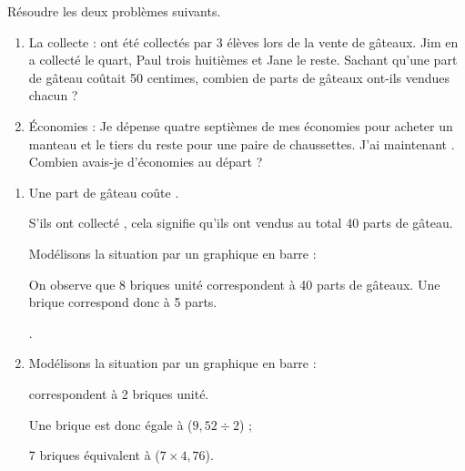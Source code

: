 \begin{Maquette}[Fiche,CorrigeFin,Colonnes=2]{}
\begin{multicols}{2}
         
      \begin{exercice}[Dur] %
      Résoudre les deux problèmes suivants.
         \begin{enumerate}
            \item La collecte :  ont été collectés par 3 élèves lors de la vente de gâteaux. Jim en  a collecté le quart, Paul trois huitièmes et Jane le reste. Sachant qu’une part de gâteau coûtait 50 centimes, combien de parts de gâteaux ont-ils vendues chacun ?
            \item Économies : Je dépense quatre septièmes de mes économies pour acheter un manteau et le tiers du reste pour une paire de chaussettes. J’ai maintenant . Combien avais-je d’économies au départ ?
         \end{enumerate}
      \end{exercice}
      
      \begin{Solution}
         \begin{enumerate}
            \item Une part de gâteau coûte . \par
               S'ils ont collecté , cela signifie qu'ils ont vendus au total 40 parts de gâteau. \par
               Modélisons la situation par un graphique en barre : \par \smallskip
                \par
               On observe que 8 briques unité correspondent à 40 parts de gâteaux. Une brique correspond donc à 5 parts. \par
               .
            \item Modélisons la situation par un graphique en barre : \par \smallskip
                \par
                correspondent à 2 briques unité. \par
               Une brique est donc égale à  ($9,52\div2$) ; \par
               7 briques équivalent à  ($7\times4,76$). \par
         \end{enumerate}
      \end{Solution}

   \end{multicols}

\end{Maquette}


